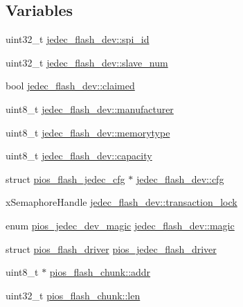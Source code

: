 \subsection*{\-Variables}
\begin{DoxyCompactItemize}
\item 
uint32\-\_\-t \hyperlink{group___p_i_o_s___f_l_a_s_h_ga0f87de9cf831cf45ad2e81d4629cf021}{jedec\-\_\-flash\-\_\-dev\-::spi\-\_\-id}
\item 
uint32\-\_\-t \hyperlink{group___p_i_o_s___f_l_a_s_h_ga38ca35aafe78e6032326184768221fab}{jedec\-\_\-flash\-\_\-dev\-::slave\-\_\-num}
\item 
bool \hyperlink{group___p_i_o_s___f_l_a_s_h_ga0252ff9aa887c054e7299923b344bf59}{jedec\-\_\-flash\-\_\-dev\-::claimed}
\item 
uint8\-\_\-t \hyperlink{group___p_i_o_s___f_l_a_s_h_gaf7bb5593bcefe3837116c4bdb768cd6e}{jedec\-\_\-flash\-\_\-dev\-::manufacturer}
\item 
uint8\-\_\-t \hyperlink{group___p_i_o_s___f_l_a_s_h_ga68ce126b7f544ebb02fa8beab9b9faa2}{jedec\-\_\-flash\-\_\-dev\-::memorytype}
\item 
uint8\-\_\-t \hyperlink{group___p_i_o_s___f_l_a_s_h_ga4253b6dd4128fd223d200bed60696804}{jedec\-\_\-flash\-\_\-dev\-::capacity}
\item 
struct \hyperlink{structpios__flash__jedec__cfg}{pios\-\_\-flash\-\_\-jedec\-\_\-cfg} $\ast$ \hyperlink{group___p_i_o_s___f_l_a_s_h_ga26db753e18e085086b539aca2438ee45}{jedec\-\_\-flash\-\_\-dev\-::cfg}
\item 
x\-Semaphore\-Handle \hyperlink{group___p_i_o_s___f_l_a_s_h_ga28870637f7372faa2a3fb2bd887a4ab7}{jedec\-\_\-flash\-\_\-dev\-::transaction\-\_\-lock}
\item 
enum \hyperlink{group___p_i_o_s___f_l_a_s_h_ga3e7c01370e9757b84f3a37ec903714f3}{pios\-\_\-jedec\-\_\-dev\-\_\-magic} \hyperlink{group___p_i_o_s___f_l_a_s_h_gaf71b8f686812a43a77983b3ec807aed7}{jedec\-\_\-flash\-\_\-dev\-::magic}
\item 
struct \hyperlink{structpios__flash__driver}{pios\-\_\-flash\-\_\-driver} \hyperlink{group___p_i_o_s___f_l_a_s_h_gab3923a09f07a535164fd799434276f27}{pios\-\_\-jedec\-\_\-flash\-\_\-driver}
\item 
uint8\-\_\-t $\ast$ \hyperlink{group___p_i_o_s___f_l_a_s_h_gab6bdf89325e231293b582afee4e49e9b}{pios\-\_\-flash\-\_\-chunk\-::addr}
\item 
uint32\-\_\-t \hyperlink{group___p_i_o_s___f_l_a_s_h_ga127467a644fb34d50d9c074535dcaec3}{pios\-\_\-flash\-\_\-chunk\-::len}

\end{DoxyCompactItemize}
